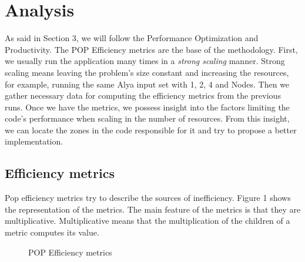 \section{Analysis}

As said in Section 3, we will follow the Performance Optimization and Productivity. The POP Efficiency metrics are the base of the methodology. First, we usually run the application many times in a \textit{strong scaling} manner. Strong scaling means leaving the problem's size constant and increasing the resources, for example, running the same Alya input set with 1, 2, 4 and Nodes. Then we gather necessary data for computing the efficiency metrics from the previous runs. Once we have the metrics, we possess insight into the factors limiting the code's performance when scaling in the number of resources. From this insight, we can locate the zones in the code responsible for it and try to propose a better implementation.

\subsection{Efficiency metrics}

Pop efficiency metrics try to describe the sources of inefficiency. Figure 1 shows the representation of the metrics. The main feature of the metrics is that they are multiplicative. Multiplicative means that the multiplication of the children of a metric computes its value.

\begin{figure}[htbp]
\centering
{}
\caption{POP Efficiency metrics}
\label{popmet}
\end{figure}

